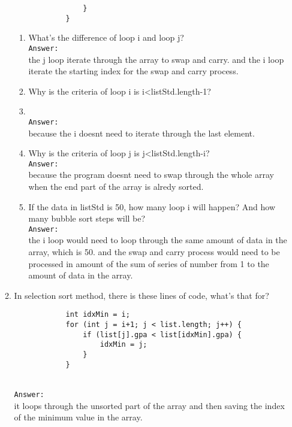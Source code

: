 \documentclass[12pt,titlepage]{article}
\begin{document}
\begin{enumerate}
\begin{enumerate}[label=\arabic*.]
\begin{verbatim}
                }
            }
        \end{verbatim}
        \begin{enumerate}[label=\alph*.]
            \item What’s the difference of loop i and loop j?
            \mbox{}\\
            \texttt{Answer: }
            \mbox{}\\
            the j loop iterate through the array to swap and carry. and the i loop iterate the starting index for the swap and carry process. 
            \item Why is the criteria of loop i is i<listStd.length-1?
            \item \mbox{}\\
            \texttt{Answer: }
            \mbox{}\\
            because the i doesnt need to iterate through the last element.
            \item Why is the criteria of loop j is j<listStd.length-i?
            \mbox{}\\
            \texttt{Answer: }
            \mbox{}\\
            because the program doesnt need to swap through the whole array when the end part of the array is alredy sorted. 
            \item If the data in listStd is 50, how many loop i will happen? And how many bubble sort steps will be?
            \mbox{}\\
            \texttt{Answer: }
            \mbox{}\\
            the i loop would need to loop through the same amount of data in the array, which is 50. and the swap and carry process would need to be processed in amount of the sum of series of number from 1 to the amount of data in the array.
        \end{enumerate}
        \item In selection sort method, there is these lines of code, what’s that for?
        \begin{verbatim}
            int idxMin = i;
            for (int j = i+1; j < list.length; j++) {
                if (list[j].gpa < list[idxMin].gpa) {
                    idxMin = j;
                }
            }
        \end{verbatim}
        \mbox{}\\
        \texttt{Answer: }
        \mbox{}\\
        it loops through the unsorted part of the array and then saving the index of the minimum value in the array. 

\end{enumerate}
\end{enumerate}
\end{document}
